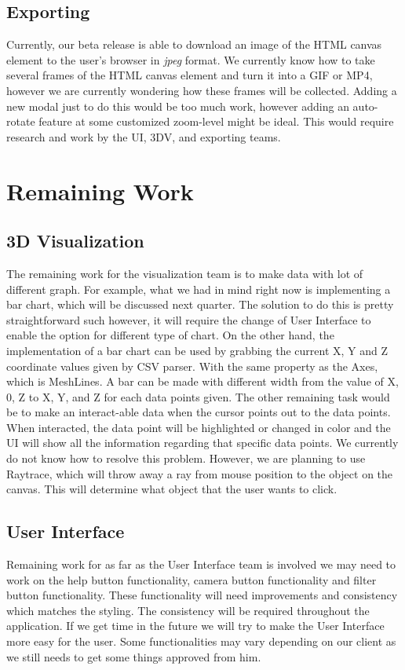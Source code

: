 \documentclass[journal,10pt,onecolumn,compsoc]{IEEEtran} \usepackage[margin=1.0in]{geometry} \usepackage{pdfpages}
\begin{document}
 \subsection{Exporting}
 Currently, our beta release is able to download an image of the HTML canvas element to the user's browser in \emph{jpeg} format. We currently know how to take several frames of the HTML canvas element and turn it into a GIF or MP4, however we are currently wondering how these frames will be collected. Adding a new modal just to do this would be too much work, however adding an auto-rotate feature at some customized zoom-level might be ideal. This would require research and work by the UI, 3DV, and exporting teams. 
  
 \section{Remaining Work}
 \subsection{3D Visualization}
 The remaining work for the visualization team is to make data with lot of different graph. For example, what we had in mind right now is implementing a bar chart, which will be discussed next quarter. The solution to do this is pretty straightforward such however, it will require the change of User Interface to enable the option for different type of chart. On the other hand, the implementation of a bar chart can be used by grabbing the current X, Y and Z coordinate values given by CSV parser. With the same property as the Axes, which is MeshLines. A bar can be made with different width from the value of X, 0, Z to X, Y, and Z for each data points given.
 \newline The other remaining task would be to make an interact-able data when the cursor points out to the data points. When interacted, the data point will be highlighted or changed in color and the UI will show all the information regarding that specific data points. We currently do not know how to resolve this problem. However, we are planning to use Raytrace, which will throw away a ray from mouse position to the object on the canvas. This will determine what object that the user wants to click. 
 
 \subsection{User Interface}
 Remaining work for as far as the User Interface team is involved  we may need to work on the help button functionality, camera button functionality and filter button functionality. These functionality will need improvements and consistency which matches the styling. The consistency will be required throughout the application. If we get time in the future we will try to make the User Interface more easy for the user. Some functionalities may vary depending on our client as we still needs to get some things approved from him. 
 
\end{document}
